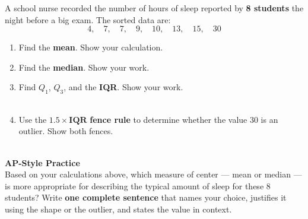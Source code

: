 \documentclass[10pt]{article}
\begin{document}
\namedateperiod

\vspace{0.18in}

\begin{tcolorbox}[colback=sky, colframe=navy, boxrule=0.9pt, arc=2mm,
    left=4mm, right=4mm, top=3mm, bottom=3mm]
\small A school nurse recorded the number of hours of sleep reported by
\textbf{8 students} the night before a big exam.
The sorted data are:
\[4,\quad 7,\quad 7,\quad 9,\quad 10,\quad 13,\quad 15,\quad 30\]
\end{tcolorbox}

\vspace{0.2in}

\begin{enumerate}[leftmargin=1.5em, itemsep=10pt]

  \item Find the \textbf{mean}. Show your calculation.\\[6pt]
        \writeline

  \item Find the \textbf{median}. Show your work.\\[6pt]
        \writeline

  \item Find $Q_1$, $Q_3$, and the \textbf{IQR}. Show your work.\\[6pt]
        \writeline\\[1pt]\writeline

  \item Use the $\mathbf{1.5 \times IQR}$ \textbf{fence rule} to determine whether
        the value 30 is an outlier. Show both fences.\\[6pt]
        \writeline\\[1pt]\writeline

\end{enumerate}

\vspace{0.18in}

\begin{tcolorbox}[colback=redbg, colframe=redacc, boxrule=0.8pt, arc=2mm,
    left=4mm, right=4mm, top=3mm, bottom=3mm]
\small\textbf{AP-Style Practice}\\[6pt]
Based on your calculations above, which measure of center --- mean or median
--- is more appropriate for describing the typical amount of sleep for these
8 students? Write \textbf{one complete sentence} that names your choice,
justifies it using the shape or the outlier, and states the value in context.\\[10pt]
\writeline\\[1pt]\writeline\\[1pt]\writeline
\end{tcolorbox}
\end{document}
